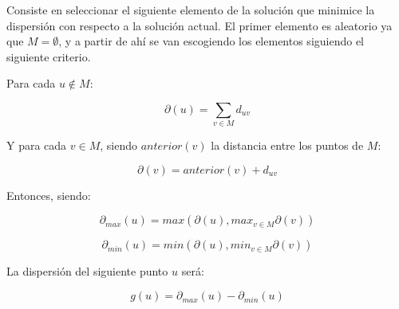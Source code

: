 \documentclass{article}
\begin{document}
    Consiste en seleccionar el siguiente elemento de la solución que minimice la dispersión con respecto a la
    solución actual. El primer elemento es aleatorio ya que $M = \emptyset$, y a partir de ahí se van escogiendo
    los elementos siguiendo el siguiente criterio.

    Para cada $u \notin M$:

    \begin{equation*}
        \partial (u) = \sum_{v \in M}d_{uv}
    \end{equation*}

    Y para cada $v \in M$, siendo $anterior(v)$ la distancia entre los puntos de $M$:

    \begin{equation*}
        \partial (v) = anterior(v)+d_{uv}
    \end{equation*}

    Entonces, siendo:

    \begin{equation*}
        \partial_{max}(u) = max(\partial (u), max_{v \in M}\partial (v))
    \end{equation*}

    \begin{equation*}
        \partial_{min}(u) = min(\partial (u), min_{v \in M}\partial (v))
    \end{equation*}

    La dispersión del siguiente punto $u$ será:

    \begin{equation*}
        g(u) = \partial_{max}(u) - \partial_{min}(u)
    \end{equation*}
\end{document}
